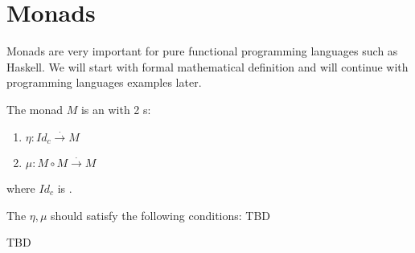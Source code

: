 \chapter{Monads}

Monads are very important for pure functional programming languages
such as Haskell. We will start with formal mathematical definition and
will continue with programming languages examples later.

\begin{definition}[Monad]
  \label{def:monad}
  The monad $M$ is an  with 2
  s:
  \begin{enumerate}
  \item $\eta: Id_c \xrightarrow{.} M$
  \item $\mu: M \circ M \xrightarrow{.} M$
  \end{enumerate}
  where $Id_c$ is .

  The $\eta, \mu$ should satisfy the following conditions:
  TBD
\end{definition}




TBD
